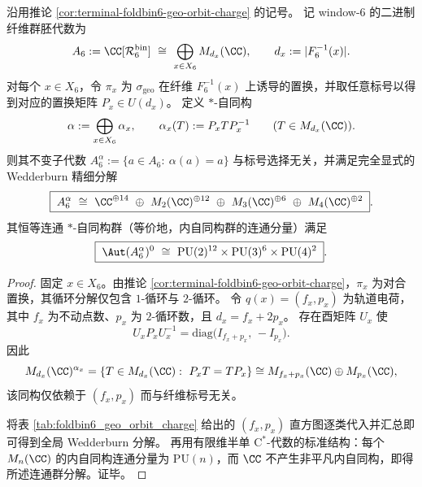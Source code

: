 
\begin{theorem}\label{thm:terminal-window6-geo-fixed-subalgebra-wedderburn}
沿用推论 \ref{cor:terminal-foldbin6-geo-orbit-charge} 的记号。
记 window-\(6\) 的二进制纤维群胚代数为
\[
A_6:=\CC[\mathcal{R}_6^{\mathrm{bin}}]\ \cong\ \bigoplus_{x\in X_6}M_{d_x}(\CC),
\qquad d_x:=|F_6^{-1}(x)|.
\]
对每个 \(x\in X_6\)，令 \(\pi_x\) 为 \(\sigma_{\mathrm{geo}}\) 在纤维 \(F_6^{-1}(x)\) 上诱导的置换，并取任意标号以得到对应的置换矩阵 \(P_x\in U(d_x)\)。
定义 \(\ast\)-自同构
\[
\alpha:=\bigoplus_{x\in X_6}\alpha_x,\qquad
\alpha_x(T):=P_xTP_x^{-1}\qquad (T\in M_{d_x}(\CC)).
\]
则其不变子代数
\(
A_6^\alpha:=\{a\in A_6:\ \alpha(a)=a\}
\)
与标号选择无关，并满足完全显式的 Wedderburn 精细分解
\[
\boxed{\;
A_6^\alpha\ \cong\
\CC^{\oplus 14}\ \oplus\ M_2(\CC)^{\oplus 12}\ \oplus\ M_3(\CC)^{\oplus 6}\ \oplus\ M_4(\CC)^{\oplus 2}\; }.
\]
其恒等连通 \(\ast\)-自同构群（等价地，内自同构群的连通分量）满足
\[
\boxed{\;
\Aut(A_6^\alpha)^0\ \cong\
\mathrm{PU}(2)^{12}\times \mathrm{PU}(3)^{6}\times \mathrm{PU}(4)^{2}\; }.
\]
\end{theorem}
\begin{proof}
固定 \(x\in X_6\)。由推论 \ref{cor:terminal-foldbin6-geo-orbit-charge}，\(\pi_x\) 为对合置换，其循环分解仅包含 \(1\)-循环与 \(2\)-循环。
令 \(q(x)=(f_x,p_x)\) 为轨道电荷，其中 \(f_x\) 为不动点数、\(p_x\) 为 \(2\)-循环数，且 \(d_x=f_x+2p_x\)。
存在酉矩阵 \(U_x\) 使
\[
U_xP_xU_x^{-1}=\mathrm{diag}\!\bigl(I_{f_x+p_x},\,-I_{p_x}\bigr).
\]
因此
\[
M_{d_x}(\CC)^{\alpha_x}
=\{T\in M_{d_x}(\CC):\ P_xT=TP_x\}
\cong M_{f_x+p_x}(\CC)\oplus M_{p_x}(\CC),
\]
该同构仅依赖于 \((f_x,p_x)\) 而与纤维标号无关。
\par
将表 \ref{tab:foldbin6_geo_orbit_charge} 给出的 \((f_x,p_x)\) 直方图逐类代入并汇总即可得到全局 Wedderburn 分解。
再用有限维半单 \(\mathrm{C}^\ast\)-代数的标准结构：每个 \(M_n(\CC)\) 的内自同构连通分量为 \(\mathrm{PU}(n)\)，而 \(\CC\) 不产生非平凡内自同构，即得所述连通群分解。证毕。
\end{proof}

